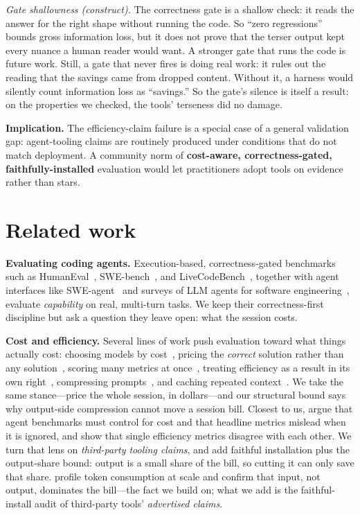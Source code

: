 \emph{Gate shallowness (construct).} The correctness gate is a shallow check: it reads the answer for the right
shape without running the code. So ``zero regressions'' bounds gross information loss, but it does not
prove that the terser output kept every nuance a human reader would want. A stronger gate that runs the
code is future work. Still, a gate that never fires is doing real work: it rules out the reading that
the savings came from dropped content.
Without it, a harness would silently count information loss as ``savings.'' So the gate's silence is
itself a result: on the properties we checked, the tools' terseness did no damage.

\textbf{Implication.} The efficiency-claim failure is a special case of a general validation gap:
agent-tooling claims are routinely produced under conditions that do not match deployment. A
community norm of \textbf{cost-aware, correctness-gated, faithfully-installed} evaluation would let
practitioners adopt tools on evidence rather than stars.

\section{Related work}
\textbf{Evaluating coding agents.} Execution-based, correctness-gated benchmarks such as
HumanEval~\cite{chen2021humaneval}, SWE-bench~\cite{jimenez2024swebench}, and
LiveCodeBench~\cite{jain2025livecodebench}, together with agent interfaces like
SWE-agent~\cite{yang2024sweagent} and surveys of LLM agents for software
engineering~\cite{liu2024seagentsurvey}, evaluate \emph{capability} on real, multi-turn tasks. We
keep their correctness-first discipline but ask a question they leave open: what the session costs.

\textbf{Cost and efficiency.} Several lines of work push evaluation toward what things actually cost:
choosing models by cost~\cite{chen2023frugalgpt}, pricing the \emph{correct} solution rather than any
solution~\cite{erol2025costofpass}, scoring many metrics at once~\cite{liang2023helm}, treating
efficiency as a result in its own right~\cite{schwartz2020greenai}, compressing
prompts~\cite{jiang2023llmlingua}, and caching repeated context~\cite{zheng2024sglang}. We take the
same stance---price the whole session, in dollars---and our structural bound says why output-side
compression cannot move a session bill. Closest to us, \citet{kapoor2024agentsmatter} argue that agent
benchmarks must control for cost and that headline metrics mislead when it is ignored, and
\citet{dehghani2022efficiency} show that single efficiency metrics disagree with each other. We turn
that lens on \emph{third-party tooling claims}, and add faithful installation plus the output-share
bound: output is a small share of the bill, so cutting it can only save that share.
\citet{bai2026spend} profile token consumption at scale and confirm that input, not output, dominates
the bill---the fact we build on; what we add is the faithful-install audit of third-party tools'
\emph{advertised claims}.

